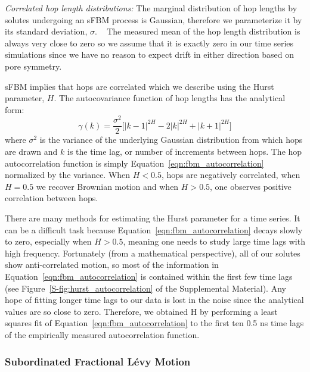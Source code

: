 \documentclass[aps,pre,preprint,groupedaddress,longbibliography]{revtex4-2}
\begin{document}
  \textit{Correlated hop length distributions:} The marginal distribution of hop 
  lengths by solutes undergoing an sFBM process is Gaussian, therefore we 
  parameterize it by its standard deviation, $\sigma$.
  ~\cite{metzler_random_2000, metzler_anomalous_2014,neusius_subdiffusion_2009}
  The measured mean of the hop length distribution is always very close to zero so
  we assume that it is exactly zero in our time series simulations since we have 
  no reason to expect drift in either direction based on pore symmetry.

  sFBM implies that hops are correlated which we describe using the Hurst parameter, $H$. 
  The autocovariance function of hop lengths has the analytical form:~\cite{mandelbrot_fractional_1968}
  \begin{equation}
    \gamma(k) = \dfrac{\sigma^2}{2}\bigg[|k-1|^{2H} - 2|k|^{2H} + |k+1|^{2H}\bigg]
  \label{eqn:fbm_autocorrelation}
  \end{equation}
  where $\sigma^2$ is the variance of the underlying Gaussian distribution from which hops are
  drawn and $k$ is the time lag, or number of increments between hops. The hop autocorrelation
  function is simply Equation~\ref{eqn:fbm_autocorrelation} normalized by the variance. 
  When $H < 0.5$, hops are negatively correlated, when $H = 0.5$ we recover Brownian motion
  and when $H > 0.5$, one observes positive correlation between hops. 
 
  There are many methods for estimating the Hurst parameter for a time series.
  \cite{clegg_practical_2006} It can be a difficult task because 
  Equation~\ref{eqn:fbm_autocorrelation} decays slowly to zero, especially when 
  $H > 0.5$, meaning one needs to study large time lags with high frequency.
  Fortunately (from a mathematical perspective), all of our solutes show anti-correlated motion, so most of the information in
  Equation~\ref{eqn:fbm_autocorrelation} is contained within the first few time lags (see 
  Figure~\ref{S-fig:hurst_autocorrelation} of the Supplemental Material). Any hope of
  fitting longer time lags to our data is lost in the noise since the analytical values
  are so close to zero. Therefore, we obtained H by performing a least squares fit of 
  Equation~\ref{eqn:fbm_autocorrelation} to the first 
  ten 0.5 ns time lags of the empirically measured autocorrelation function.

  \subsubsection{Subordinated Fractional L\'evy Motion}\label{method:sflm}
\end{document}
